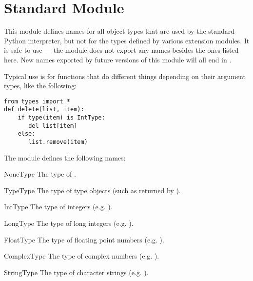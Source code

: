 \section{Standard Module }




This module defines names for all object types that are used by the
standard Python interpreter, but not for the types defined by various
extension modules.  It is safe to use  ---
the module does not export any names besides the ones listed here.
New names exported by future versions of this module will all end in
.

Typical use is for functions that do different things depending on
their argument types, like the following:

\begin{verbatim}
from types import *
def delete(list, item):
    if type(item) is IntType:
       del list[item]
    else:
       list.remove(item)
\end{verbatim}

The module defines the following names:

\begin{datadesc}{NoneType}
The type of .
\end{datadesc}

\begin{datadesc}{TypeType}
The type of type objects (such as returned by
).
\end{datadesc}

\begin{datadesc}{IntType}
The type of integers (e.g. ).
\end{datadesc}

\begin{datadesc}{LongType}
The type of long integers (e.g. ).
\end{datadesc}

\begin{datadesc}{FloatType}
The type of floating point numbers (e.g. ).
\end{datadesc}

\begin{datadesc}{ComplexType}
The type of complex numbers (e.g. ).
\end{datadesc}

\begin{datadesc}{StringType}
The type of character strings (e.g. ).
\end{datadesc}

